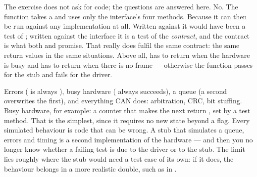 The exercise does not ask for code; the questions are answered here.
 No. The function takes a  and uses only the interface's four
methods.
 Because it can then be run against any implementation at all. Written against 
it would have been a test of ; written against the interface it is a test of the
\emph{contract}, and the contract is what both  and  promise.
 That  really does fulfil the same contract: the same return values in the same
situations. Above all,  has to return  when the hardware is busy and
 has to return  when there is no frame --- otherwise the function
passes for the stub and fails for the driver.

 Errors ( is always ), busy hardware ( always
succeeds), a queue (a second  overwrites the first), and everything CAN does:
arbitration, CRC, bit stuffing.
 Busy hardware, for example: a counter that makes the next  return
, set by a test method. That is the simplest, since it requires no new state beyond a
flag.
 Every simulated behaviour is code that can be wrong. A stub that simulates a queue, errors
and timing is a second implementation of the hardware --- and then you no longer know whether a
failing test is due to the driver or to the stub. The limit lies roughly where the stub would need
a test case of its own: if it does, the behaviour belongs in a more realistic double, such as
 in .
